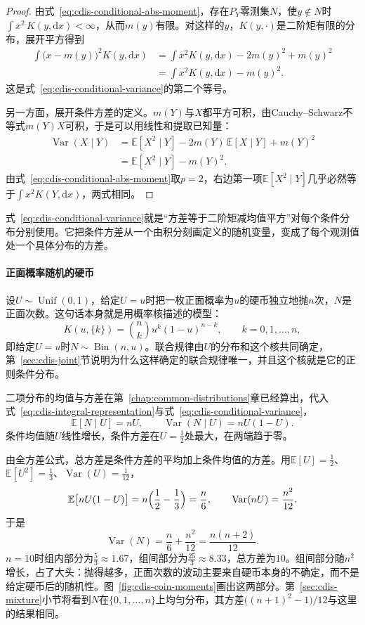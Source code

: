 \begin{proof}
由式~\eqref{eq:cdis-conditional-abs-moment}，存在$P_Y$零测集$N$，使$y\notin N$时$\int x^{2}\,K(y,\mathrm{d}x)<\infty$，从而$m(y)$有限。对这样的$y$，$K(y,\cdot)$是二阶矩有限的分布，展开平方得到
\[
 \begin{aligned}
 \int\bigl(x-m(y)\bigr)^{2}K(y,\mathrm{d}x)&=\int x^{2}K(y,\mathrm{d}x)-2m(y)^{2}+m(y)^{2}\\
 &=\int x^{2}K(y,\mathrm{d}x)-m(y)^{2}.
 \end{aligned}
\]
这是式~\eqref{eq:cdis-conditional-variance}的第二个等号。

另一方面，展开条件方差的定义。$m(Y)$与$X$都平方可积，由Cauchy--Schwarz不等式$m(Y)X$可积，于是可以用线性和提取已知量：
\[
 \begin{aligned}
 \operatorname{Var}(X\mid Y)&=\mathbb{E}[X^{2}\mid Y]-2m(Y)\,\mathbb{E}[X\mid Y]+m(Y)^{2}\\
 &=\mathbb{E}[X^{2}\mid Y]-m(Y)^{2}.
 \end{aligned}
\]
由式~\eqref{eq:cdis-conditional-abs-moment}取$p=2$，右边第一项$\mathbb{E}[X^{2}\mid Y]$几乎必然等于$\int x^{2}K(Y,\mathrm{d}x)$，两式相同。
\end{proof}

式~\eqref{eq:cdis-conditional-variance}就是“方差等于二阶矩减均值平方”对每个条件分布分别使用。它把条件方差从一个由积分刻画定义的随机变量，变成了每个观测值处一个具体分布的方差。

\paragraph{正面概率随机的硬币}
设$U\sim\operatorname{Unif}(0,1)$，给定$U=u$时把一枚正面概率为$u$的硬币独立地抛$n$次，$N$是正面次数。这句话本身就是用概率核描述的模型：
\[
 K(u,\{k\})=\binom{n}{k}u^{k}(1-u)^{n-k},\qquad k=0,1,\dots,n ,
\]
即给定$U=u$时$N\sim\operatorname{Bin}(n,u)$。联合规律由$U$的分布和这个核共同确定，第~\ref{sec:cdis-joint}节说明为什么这样确定的联合规律唯一，并且这个核就是它的正则条件分布。

二项分布的均值与方差在第~\ref{chap:common-distributions}章已经算出，代入式~\eqref{eq:cdis-integral-representation}与式~\eqref{eq:cdis-conditional-variance}，
\[
 \mathbb{E}[N\mid U]=nU,\qquad \operatorname{Var}(N\mid U)=nU(1-U).
\]
条件均值随$U$线性增长，条件方差在$U=\tfrac12$处最大，在两端趋于零。

由全方差公式，总方差是条件方差的平均加上条件均值的方差。用$\mathbb{E}[U]=\tfrac12$、$\mathbb{E}[U^{2}]=\tfrac13$、$\operatorname{Var}(U)=\tfrac1{12}$，
\[
 \mathbb{E}\bigl[nU(1-U)\bigr]=n\Bigl(\frac12-\frac13\Bigr)=\frac n6,\qquad \operatorname{Var}(nU)=\frac{n^{2}}{12}.
\]
于是
\[
 \operatorname{Var}(N)=\frac n6+\frac{n^{2}}{12}=\frac{n(n+2)}{12}.
\]
$n=10$时组内部分为$\tfrac53\approx1.67$，组间部分为$\tfrac{25}{3}\approx8.33$，总方差为$10$。组间部分随$n^{2}$增长，占了大头：抛得越多，正面次数的波动主要来自硬币本身的不确定，而不是给定硬币后的随机性。图~\ref{fig:cdis-coin-moments}画出这两部分。第~\ref{sec:cdis-mixture}小节将看到$N$在$\{0,1,\dots,n\}$上均匀分布，其方差$\bigl((n+1)^{2}-1\bigr)/12$与这里的结果相同。

